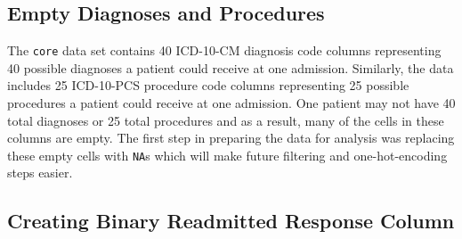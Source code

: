 \documentclass[sn-basic,pdflatex]{sn-jnl}
\theoremstyle{remark}
\theoremstyle{definition}
\begin{document}
\hypertarget{sec2A}{%
\subsection{Empty Diagnoses and Procedures}\label{sec2A}}

The \texttt{core} data set contains 40 ICD-10-CM diagnosis code columns
representing 40 possible diagnoses a patient could receive at one
admission. Similarly, the data includes 25 ICD-10-PCS procedure code
columns representing 25 possible procedures a patient could receive at
one admission. One patient may not have 40 total diagnoses or 25 total
procedures and as a result, many of the cells in these columns are
empty. The first step in preparing the data for analysis was replacing
these empty cells with \texttt{NA}s which will make future filtering and
one-hot-encoding steps easier.

\hypertarget{sec2B}{%
\subsection{Creating Binary Readmitted Response Column}\label{sec2B}}
\end{document}
